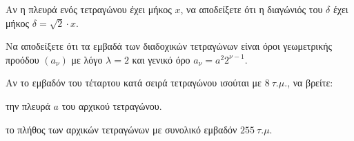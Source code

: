 \begin{alist}
\item
\begin{rlist}
\item
  Αν η πλευρά ενός τετραγώνου έχει μήκος $x$, να αποδείξετε ότι η διαγώνιός του $\delta$ έχει μήκος $\delta = \sqrt{2} \cdot x$.

\item
  Να αποδείξετε ότι τα εμβαδά των διαδοχικών τετραγώνων είναι όροι γεωμετρικής προόδου $(a_{\nu})$ με λόγο $\lambda = 2$ και γενικό όρο $a_{\nu} = a^{2}2^{\nu - 1}$.
\end{rlist}
\item Αν το εμβαδόν του τέταρτου κατά σειρά τετραγώνου ισούται με $8\ \tau.\mu.$, να βρείτε:
\begin{rlist}
\item την πλευρά $a$ του αρχικού τετραγώνου.

\item
  το πλήθος των αρχικών τετραγώνων με συνολικό εμβαδόν $255\ \tau.\mu.$
\end{rlist}
\end{alist}

